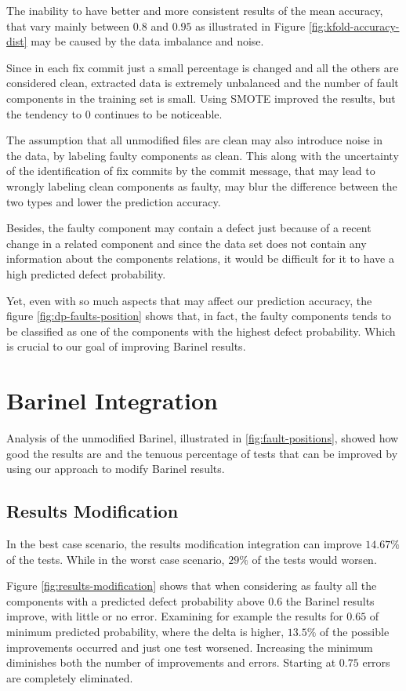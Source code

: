 The inability to have better and more consistent results of the mean accuracy, that vary mainly between $0.8$ and $0.95$ as illustrated in Figure \ref{fig:kfold-accuracy-dist} may be caused by the data imbalance and noise.

Since in each fix commit just a small percentage is changed and all the others are considered clean, extracted data is extremely unbalanced and the number of fault components in the training set is small. Using SMOTE improved the results, but the tendency to $0$ continues to be noticeable.

The assumption that all unmodified files are clean may also introduce noise in the data, by labeling faulty components as clean. This along with the uncertainty of the identification of fix commits by the commit message, that may lead to wrongly labeling clean components as faulty, may blur the difference between the two types and lower the prediction accuracy.

Besides, the faulty component may contain a defect just because of a recent change in a related component and since the data set does not contain any information about the components relations, it would be difficult for it to have a high predicted defect probability.

Yet, even with so much aspects that may affect our prediction accuracy, the figure \ref{fig:dp-faults-position} shows that, in fact, the faulty components tends to be classified as one of the components with the highest defect probability. Which is crucial to our goal of improving Barinel results.

\section{Barinel Integration}

Analysis of the unmodified Barinel, illustrated in \ref{fig:fault-positions}, showed how good the results are and the tenuous percentage of tests that can be improved by using our approach to modify Barinel results.

\subsection{Results Modification}

In the best case scenario, the results modification integration can improve $14.67\%$ of the tests. While in the worst case scenario, $29\%$ of the tests would worsen.

Figure \ref{fig:results-modification} shows that when considering as faulty all the components with a predicted defect probability above $0.6$ the Barinel results improve, with little or no error. Examining for example the results for $0.65$ of minimum predicted probability, where the delta is higher, $13.5\%$ of the possible improvements occurred and just one test worsened. Increasing the minimum diminishes both the number of improvements and errors. Starting at $0.75$ errors are completely eliminated.

